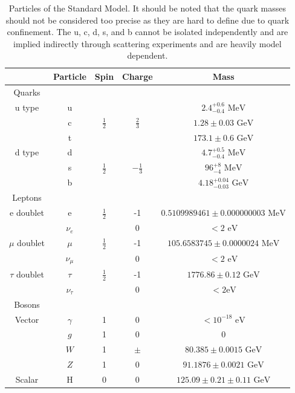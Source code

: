 \begin{table}[h]
\begin{center}
\footnotesize
\begin{tabular}[h]{|c||c|c|c|c|}
\hline
 & Particle & Spin & Charge & Mass \\
\hline\hline
Quarks &&&&\\
\hline
u type &u& & &${2.4^{+0.6}_{-0.4} \text{ MeV}}$\\
 &c&${\frac{1}{2}}$&${\frac{2}{3}}$&${1.28\pm{0.03} \text{ GeV}}$\\
 &t& & &${173.1\pm{0.6} \text{ GeV}}$\\
\hline
d type & d& & & ${4.7^{+0.5}_{-0.4} \text{ MeV}}$\\
 & s & ${\frac{1}{2}}$ & ${-\frac{1}{3}}$ & ${96^{+8}_{-4} \text{ MeV}}$\\
 & b & & & ${4.18^{+0.04}_{-0.03} \text{ GeV}}$\\
\hline\hline
Leptons &&&&\\
\hline
e doublet & e & ${\frac{1}{2}}$ & -1 &${0.5109989461\pm{}0.000000003 \text{ MeV}}$\\
 & ${\nu_{e}}$ & & 0 & ${< 2 \text{ eV}}$\\
 \hline
${\mu}$ doublet & ${\mu}$ & ${\frac{1}{2}}$ & -1 &${105.6583745\pm{}0.0000024 \text{ MeV}}$\\
 & ${\nu_{\mu}}$ & & 0 & ${< 2 \text{ eV}}$\\
 \hline
${\tau}$ doublet & ${\tau}$ & ${\frac{1}{2}}$ & -1 &${1776.86\pm{}0.12 \text{ GeV}}$\\
 & ${\nu_{\tau}}$ & & 0 & ${< 2 \text{eV}}$\\
 \hline\hline
 Bosons &&&&\\
 \hline
 Vector & ${\gamma}$ & 1 & 0 & ${< 10^{-18} \text{ eV}}$\\
 & ${g}$ & 1 & 0 & ${0}$\\
 & ${W}$ & 1 & ${\pm}$ & ${80.385\pm{}0.0015 \text{ GeV}}$\\
 & ${Z}$ & 1 & 0 & ${91.1876\pm{}0.0021 \text{ GeV}}$\\
 \hline
 Scalar & H & 0& 0 & ${125.09\pm{}0.21\pm{}0.11 \text{ GeV}}$\\
 \hline
\end{tabular}
\caption[Particles of the Standard Model.]{Particles of the Standard Model\cite{PDG2018}. It should be noted that the quark masses should not be considered too precise as they are hard to define due to quark confinement\cite{QuarkConfinement}.  The u, c, d, s, and b cannot be isolated independently and are implied indirectly through scattering experiments and are heavily model dependent.}
\label{tab:SM}
\end{center}
\end{table}


